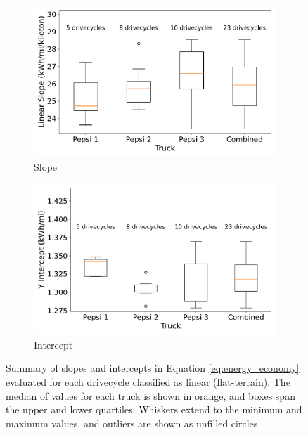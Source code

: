 \begin{figure}[H]
    \centering
    \begin{subfigure}[b]{0.49\textwidth}
        \centering
        \includegraphics[width=\textwidth]{figures/slope_distribution.pdf}
        \caption{Slope}
        \label{fig:slope_distribution}
    \end{subfigure}
    \hfill
    \begin{subfigure}[b]{0.49\textwidth}
        \centering
        \includegraphics[width=\textwidth]{figures/intercept_distribution.pdf}
        \caption{Intercept}
        \label{fig:intercept_distribution}
    \end{subfigure}
    \caption{Summary of slopes and intercepts in Equation \ref{eq:energy_economy} evaluated for each drivecycle classified as linear (flat-terrain). The median of values for each truck is shown in orange, and boxes span the upper and lower quartiles. Whiskers extend to the minimum and maximum values, and outliers are shown as unfilled circles.}
    \label{fig:slope_intercept_distributions}
\end{figure}

